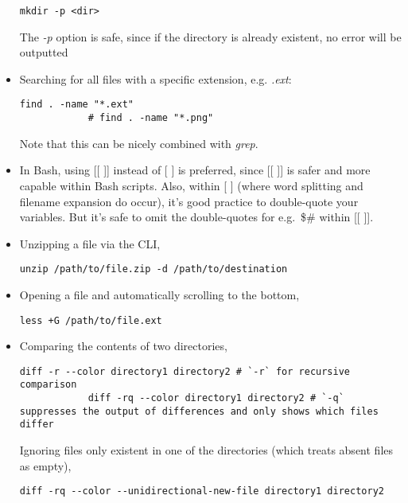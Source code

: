 \documentclass[12pt, a4paper]{article}
\numberwithin{equation}{section}
\theoremstyle{definition}
\theoremstyle{definition}
\begin{document}
\begin{itemize}
		\begin{lstlisting}[style=mystylebash, label=alg:bash__dir_creation, xleftmargin=\parindent]
			mkdir -p <dir>
		\end{lstlisting}
		
		The \textit{-p} option is safe, since if the directory is already existent, no error will be outputted
		
		\item Searching for all files with a specific extension, e.g. \textit{.ext}: 
		
		\begin{lstlisting}[style=mystylebash, label=alg:bash_find, xleftmargin=\parindent]
			find . -name "*.ext"
			# find . -name "*.png"
		\end{lstlisting}
		
		Note that this can be nicely combined with \textit{grep}.
		
		\item In Bash, using [[ ]] instead of [ ] is preferred, since [[ ]]  is safer and more capable within Bash scripts. Also, within [ ] (where word splitting and filename expansion do occur), it's good practice to double-quote your variables. But it's safe to omit the double-quotes for e.g.~\$\# within [[ ]].
		
		\item Unzipping a file via the CLI, 
		\begin{lstlisting}[style=mystylebash, label=alg:bash_unzip, xleftmargin=\parindent]
			unzip /path/to/file.zip -d /path/to/destination
		\end{lstlisting}
		
		\item Opening a file and automatically scrolling to the bottom,
		
		\begin{lstlisting}[style=mystylebash, label=alg:less__bottom_scroll, xleftmargin=\parindent]
			less +G /path/to/file.ext
		\end{lstlisting}
	
		\item Comparing the contents of two directories,
		\begin{lstlisting}[style=mystylebash, label=alg:bash_diff__dir, xleftmargin=\parindent]
			diff -r --color directory1 directory2 # `-r` for recursive comparison
			diff -rq --color directory1 directory2 # `-q` suppresses the output of differences and only shows which files differ
		\end{lstlisting}
		
		Ignoring files only existent in one of the directories (which treats absent files as empty),
		\begin{lstlisting}[style=mystylebash, label=alg:, xleftmargin=\parindent]
			diff -rq --color --unidirectional-new-file directory1 directory2 
		\end{lstlisting}
		
	\end{itemize}
	
\end{document}

